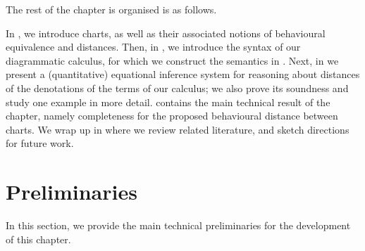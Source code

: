 


The rest of the chapter is organised is as follows.

In , we introduce charts, as well as their associated notions of behavioural equivalence and distances. Then, in , we introduce the syntax of our diagrammatic calculus, for which we construct the semantics in . Next, in  we present a (quantitative) equational inference system for reasoning about distances of the denotations of the terms of our calculus; we also prove its soundness and study one example in more detail.  contains the main technical result of the chapter, namely completeness for the proposed behavioural distance between charts. We wrap up in  where we review related literature, and sketch directions for future work.  

\section{Preliminaries}\label{c3:sec:preliminaries}
In this section, we provide the main technical preliminaries for the development of this chapter.
